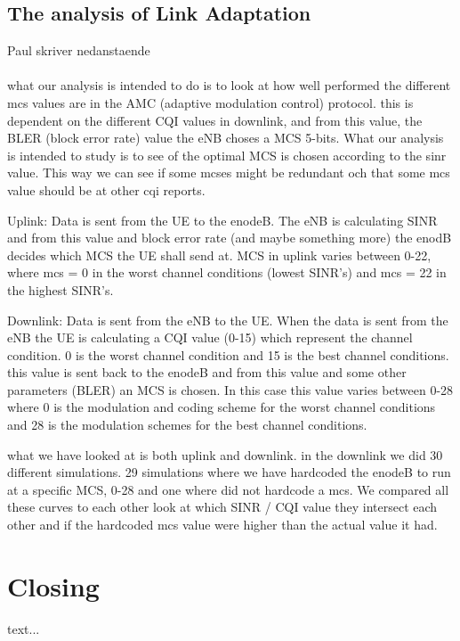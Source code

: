 \documentclass[cropmarks, frame, english]{idamasterthesis}
\begin{document}
\section{The analysis of Link Adaptation}
Paul skriver nedanstaende \\ \\
what our analysis is intended to do is to look at how well performed the different mcs values are in the AMC (adaptive modulation control) protocol. this is dependent on the different CQI values in downlink, and from this value, the BLER (block error rate) value the eNB choses a MCS 5-bits. What our analysis is intended to study is to see of the optimal MCS is chosen according to the sinr value. This way we can see if some mcses might be redundant och that some mcs value should be at other cqi reports. 

Uplink: \newline
Data is sent from the UE to the enodeB. The eNB is calculating SINR and from this value and block error rate (and maybe something more) the enodB decides which MCS the UE shall send at. MCS in uplink varies between 0-22, where mcs = 0 in the worst channel conditions (lowest SINR's) and mcs = 22 in the highest SINR's. 

Downlink: \newline
Data is sent from the eNB to the UE. When the data is sent from the eNB the UE is calculating a CQI value (0-15) which represent the channel condition. 0 is the worst channel condition and 15 is the best channel conditions. this value is sent back to the enodeB and from this value and some other parameters (BLER) an MCS is chosen. In this case this value varies between 0-28 where 0 is the modulation and coding scheme for the worst channel conditions and 28 is the modulation schemes for the best channel conditions.

what we have looked at is both uplink and downlink. in the downlink we did 30 different simulations. 29 simulations where we have hardcoded the enodeB to run at a specific MCS, 0-28 and one where did not hardcode a mcs. We compared all these curves to each other look at which SINR / CQI value they intersect each other and if the hardcoded mcs value were higher than the actual value it had.

\chapter{Closing}

text...
\end{document}
